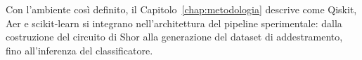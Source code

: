 \begin{onehalfspace}
Con l'ambiente così definito, il Capitolo~\ref{chap:metodologia} descrive come Qiskit, Aer e scikit-learn si integrano nell'architettura del pipeline sperimentale: dalla costruzione del circuito di Shor alla generazione del dataset di addestramento, fino all'inferenza del classificatore.

\end{onehalfspace}
